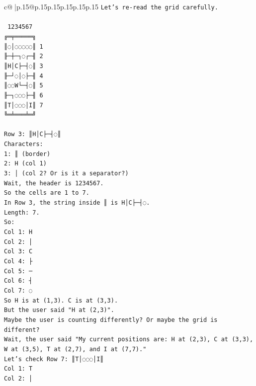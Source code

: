 \documentclass{article}
\begin{document}
{\begin{supertabular}{c@{$\;$}|p{.15\linewidth}@{}p{.15\linewidth}p{.15\linewidth}p{.15\linewidth}p{.15\linewidth}p{.15\linewidth}}
{{{\texttt{Let's re{-}read the grid carefully.} \\
\\ 
\texttt{ 1234567} \\
\texttt{╔═╤═════╗} \\
\texttt{║◌│◌◌◌◌◌║ 1} \\
\texttt{╟─┼─┐◌┌─╢ 2} \\
\texttt{║H│C├─┤◌║ 3} \\
\texttt{╟─┘◌│◌├─╢ 4} \\
\texttt{║◌◌W└─┤◌║ 5} \\
\texttt{╟─┐◌◌◌├─╢ 6} \\
\texttt{║T│◌◌◌│I║ 7} \\
\texttt{╚═╧═══╧═╝} \\
\\ 
\texttt{Row 3: ║H│C├─┤◌║} \\
\texttt{Characters:} \\
\texttt{1: ║ (border)} \\
\texttt{2: H (col 1)} \\
\texttt{3: │ (col 2? Or is it a separator?)} \\
\texttt{Wait, the header is 1234567.} \\
\texttt{So the cells are 1 to 7.} \\
\texttt{In Row 3, the string inside ║ is H│C├─┤◌.} \\
\texttt{Length: 7.} \\
\texttt{So:} \\
\texttt{Col 1: H} \\
\texttt{Col 2: │} \\
\texttt{Col 3: C} \\
\texttt{Col 4: ├} \\
\texttt{Col 5: ─} \\
\texttt{Col 6: ┤} \\
\texttt{Col 7: ◌} \\
\texttt{So H is at (1,3). C is at (3,3).} \\
\texttt{But the user said "H at (2,3)".} \\
\texttt{Maybe the user is counting differently? Or maybe the grid is different?} \\
\texttt{Wait, the user said "My current positions are: H at (2,3), C at (3,3), W at (3,5), T at (2,7), and I at (7,7)."} \\
\texttt{Let's check Row 7: ║T│◌◌◌│I║} \\
\texttt{Col 1: T} \\
\texttt{Col 2: │} \\
}}}
\end{supertabular}}
\end{document}
